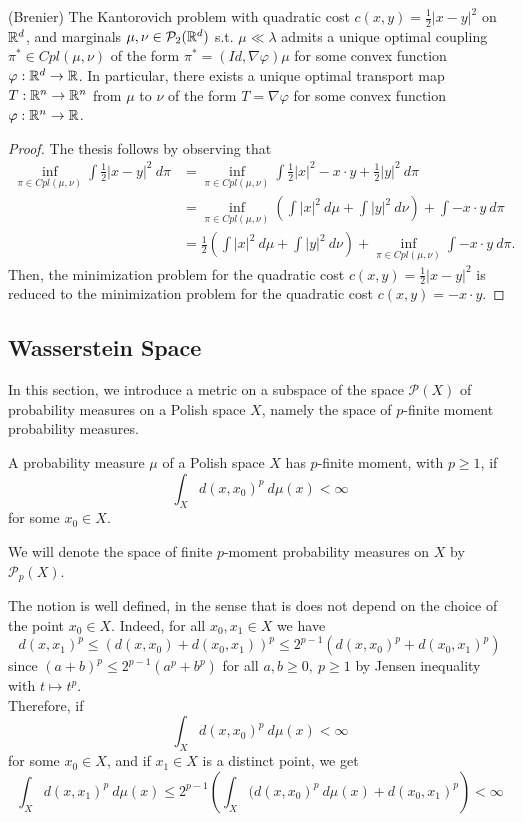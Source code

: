 \documentclass[../main.tex]{subfiles}
\begin{document}
\begin{theorem}
    (Brenier)
    The Kantorovich problem with quadratic cost $c(x, y) = \frac{1}{2}|x-y|^2$ on $\mathbb{R}^d$, and marginals $\mu, \nu\in\mathcal{P}_2(\mathbb{R}^d)$ s.t. $\mu\ll\lambda$ admits a unique optimal coupling $\pi^*\in Cpl(\mu, \nu)$ of the form $\pi^* = (Id, \nabla\varphi)\mu$ for some convex function $\varphi: \mathbb{R}^d \to \mathbb{R}$. In particular, there exists a unique optimal transport map $T: \mathbb{R}^n \to \mathbb{R}^n$ from $\mu$ to $\nu$ of the form $T=\nabla\varphi$ for some convex function $\varphi: \mathbb{R}^n\to\mathbb{R}$.    
\end{theorem}
\begin{proof}
    The thesis follows by observing that 
    \begin{align*}
        \inf_{\pi\in Cpl(\mu, \nu)} \int \frac{1}{2}|x-y|^2 \ d\pi
        &= \inf_{\pi\in Cpl(\mu, \nu)} \int \frac{1}{2} |x|^2 - x\cdot y + \frac{1}{2}|y|^2  \ d\pi \\
        &= \inf_{\pi\in Cpl(\mu, \nu)} \left(\int |x|^2 \ d\mu + \int |y|^2 \ d\nu\right) + \int -x\cdot y \ d\pi \\
        &= \frac{1}{2}\left(\int |x|^2 \ d\mu + \int |y|^2 \ d\nu\right) + \inf_{\pi\in Cpl(\mu, \nu)}  \int -x\cdot y \ d\pi.
    \end{align*}
    Then, the minimization problem for the quadratic cost $c(x, y) = \frac{1}{2}|x-y|^2$ is reduced to the minimization problem for the quadratic cost $c(x, y) = -x\cdot y$.
\end{proof}

\subsection{Wasserstein Space}
In this section, we introduce a metric on a subspace of the space $\mathcal{P}(X)$ of probability measures on a Polish space $X$, namely the space of $p$-finite moment probability measures.

\begin{definition}
    A probability measure $\mu$ of a Polish space $X$ has $p$-finite moment, with $p\geq 1$, if $$\int_X d(x, x_0)^p \ d\mu(x)<\infty$$ for some $x_0\in X$.
\end{definition}
We will denote the space of finite $p$-moment probability measures on $X$ by $\mathcal{P}_p(X)$.

\begin{remark}
    The notion is well defined, in the sense that is does not depend on the choice of the point $x_0\in X$. Indeed, for all $x_0, x_1\in X$ we have
    $$
    d(x, x_1)^p 
    \leq (d(x, x_0) + d(x_0, x_1))^p 
    \leq 2^{p-1} (d(x, x_0)^p + d(x_0, x_1)^p)
    $$
    since $(a+b)^p\leq 2^{p-1}(a^p+b^p)$ for all $a,b\geq 0, \ p\geq 1$ by Jensen inequality with $t\mapsto t^p$. \\
    Therefore, if $$\int_X d(x, x_0)^p \ d\mu(x)<\infty$$ for some $x_0\in X$, and if $x_1\in X$ is a distinct point, we get 
    $$
    \int_X d(x, x_1)^p \ d\mu(x)
    \leq 2^{p-1} \left(\int_X (d(x, x_0)^p \ d\mu(x) + d(x_0, x_1)^p\right) < \infty 
    $$
\end{remark}
\end{document}
